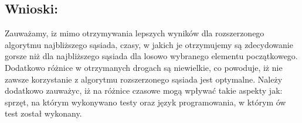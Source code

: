   \subsection{Wnioski: }
    Zauważamy, iz mimo otrzymywania lepszych wyników dla rozszerzonego algorytmu najbliższego sąsiada, czasy, w jakich je otrzymujemy są zdecydowanie gorsze niż dla najbliższego sąsiada dla losowo wybranego elementu początkowego. Dodatkowo różnice w otrzymanych drogach są niewielkie, co powoduje, iż nie zawsze korzystanie z algorytmu rozszerzonego sąsiada jest optymalne. Należy dodatkowo zauważyc, iż na różnice czasowe mogą wpływać takie aspekty jak: sprzęt, na którym wykonywano testy oraz język programowania, w którym ów test został wykonany.

